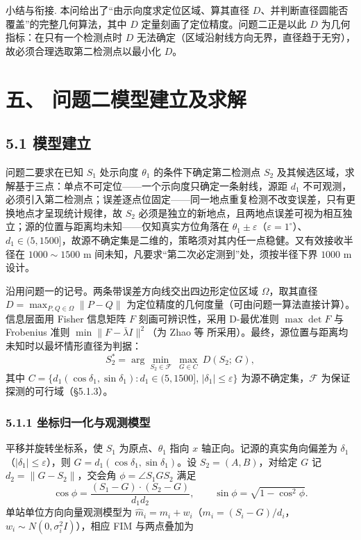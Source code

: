\documentclass[UTF8, zihao=5,AutoFakeBold=2]{ctexart}
\begin{document}
	\medskip
	\noindent 小结与衔接. 本问给出了“由示向度求定位区域、算其直径 \(D\)、并判断直径圆能否覆盖”的完整几何算法，其中 \(D\) 定量刻画了定位精度。问题二正是以此 \(D\) 为几何指标：在只有一个检测点时 \(D\) 无法确定（区域沿射线方向无界，直径趋于无穷），故必须合理选取第二检测点以最小化 \(D\)。



\section*{五、 问题二模型建立及求解}

	\subsection*{5.1 模型建立}
		问题二要求在已知 \(S_1\) 处示向度 \(\theta_1\) 的条件下确定第二检测点 \(S_2\) 及其候选区域，求解基于三点：单点不可定位——一个示向度只确定一条射线，源距 \(d_1\) 不可观测，必须引入第二检测点；误差逐点位固定——同一地点重复检测不改变误差，只有更换地点才呈现统计规律，故 \(S_2\) 必须是独立的新地点，且两地点误差可视为相互独立；源的位置与距离均未知——仅知真实方位角落在 \(\theta_1\pm\varepsilon\)（\(\varepsilon=1^\circ\)）、\(d_1\in(5,1500]\)，故源不确定集是二维的，策略须对其内任一点稳健。又有效接收半径在 \(1000\sim1500\) m 间未知，凡要求“第二次必定测到”处，须按半径下界 \(1000\) m 设计。

		沿用问题一的记号。两条带误差方向线交出四边形定位区域 \(\Omega\)，取其直径 \(D=\max_{P,Q\in\Omega}\lVert P-Q\rVert\) 为定位精度的几何度量（可由问题一算法直接计算）。信息层面用 Fisher 信息矩阵 \(F\) 刻画可辨识性，采用 D-最优准则 \(\max\det F\) 与 Frobenius 准则 \(\min\lVert F-\bar\lambda I\rVert^2\)（为 Zhao 等\cite{zhao2012} 所采用）。最终，源位置与距离均未知时以最坏情形直径为判据：
		\begin{equation}
			S_2^\ast=\arg\min_{S_2\in\mathcal F}\ \max_{G\in C}\ D(S_2;\,G),
			\label{eq:minimax}
		\end{equation}
		其中 \(C=\{d_1(\cos\delta_1,\sin\delta_1):d_1\in(5,1500],\,|\delta_1|\le\varepsilon\}\) 为源不确定集，\(\mathcal F\) 为保证探测的可行域（\S5.1.3）。

		\subsubsection*{5.1.1 坐标归一化与观测模型}
		平移并旋转坐标系，使 \(S_1\) 为原点、\(\theta_1\) 指向 \(x\) 轴正向。记源的真实角向偏差为 \(\delta_1\)（\(|\delta_1|\le\varepsilon\)），则 \(G=d_1(\cos\delta_1,\sin\delta_1)\)。设 \(S_2=(A,B)\)，对给定 \(G\) 记 \(d_2=\lVert G-S_2\rVert\)，交会角 \(\phi=\angle S_1GS_2\) 满足
		\begin{equation}
			\cos\phi=\frac{(S_1-G)\cdot(S_2-G)}{d_1d_2},\qquad \sin\phi=\sqrt{1-\cos^2\phi}.
			\label{eq:phi}
		\end{equation}
		单站单位方向向量观测模型为 \(\hat m_i=m_i+w_i\)（\(m_i=(S_i-G)/d_i\)，\(w_i\sim N(0,\sigma_i^2I)\)），相应 FIM 与两点叠加为
		
\end{document}
